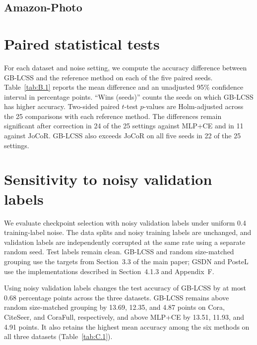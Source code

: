 \documentclass[10pt,letterpaper,nopreprintline]{elsarticle}
\begin{document}
\Needspace{120pt}

\subsection{Amazon-Photo}\label{sec:A.5}



\FloatBarrier

\setcounter{table}{0}

\section{Paired statistical tests}\label{sec:B}

For each dataset and noise setting, we compute the accuracy difference between GB-LCSS and the reference method on each of the five paired seeds. Table~\ref{tab:B.1} reports the mean difference and an unadjusted 95\% confidence interval in percentage points. ``Wins (seeds)'' counts the seeds on which GB-LCSS has higher accuracy. Two-sided paired \(t\)-test \(p\)-values are Holm-adjusted across the 25 comparisons with each reference method. The differences remain significant after correction in 24 of the 25 settings against MLP+CE and in 11 against JoCoR. GB-LCSS also exceeds JoCoR on all five seeds in 22 of the 25 settings.



\FloatBarrier

\setcounter{table}{0}

\section{Sensitivity to noisy validation labels}\label{sec:C}

We evaluate checkpoint selection with noisy validation labels under uniform 0.4 training-label noise. The data splits and noisy training labels are unchanged, and validation labels are independently corrupted at the same rate using a separate random seed. Test labels remain clean. GB-LCSS and random size-matched grouping use the targets from Section~3.3 of the main paper; GSDN and PosteL use the implementations described in Section~4.1.3 and Appendix~F.



Using noisy validation labels changes the test accuracy of GB-LCSS by at most 0.68 percentage points across the three datasets. GB-LCSS remains above random size-matched grouping by 13.69, 12.35, and 4.87 points on Cora, CiteSeer, and CoraFull, respectively, and above MLP+CE by 13.51, 11.93, and 4.91 points. It also retains the highest mean accuracy among the six methods on all three datasets (Table~\ref{tab:C.1}).
\end{document}
